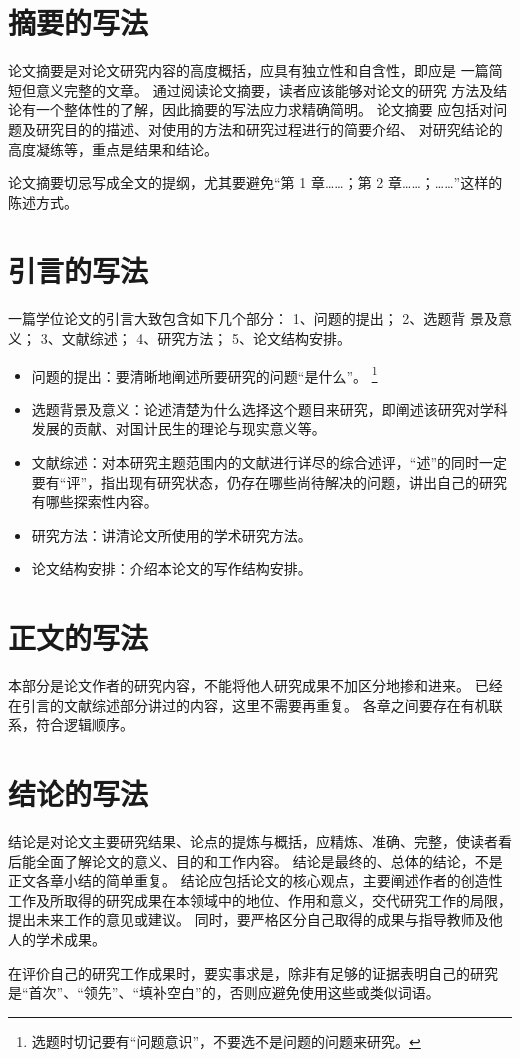 \section{摘要的写法}

论文摘要是对论文研究内容的高度概括，应具有独立性和自含性，即应是 一篇简短但意义完整的文章。
通过阅读论文摘要，读者应该能够对论文的研究 方法及结论有一个整体性的了解，因此摘要的写法应力求精确简明。
论文摘要 应包括对问题及研究目的的描述、对使用的方法和研究过程进行的简要介绍、 对研究结论的高度凝练等，重点是结果和结论。

论文摘要切忌写成全文的提纲，尤其要避免“第 1 章……；第 2 章……；……”这样的陈述方式。



\section{引言的写法}

一篇学位论文的引言大致包含如下几个部分：
1、问题的提出；
2、选题背 景及意义；
3、文献综述；
4、研究方法；
5、论文结构安排。
\begin{itemize}
  \item 问题的提出：要清晰地阐述所要研究的问题“是什么”。
    \footnote{选题时切记要有“问题意识”，不要选不是问题的问题来研究。}
  \item 选题背景及意义：论述清楚为什么选择这个题目来研究，即阐述该研究对学科发展的贡献、对国计民生的理论与现实意义等。
  \item 文献综述：对本研究主题范围内的文献进行详尽的综合述评，“述”的同时一定要有“评”，指出现有研究状态，仍存在哪些尚待解决的问题，讲出自己的研究有哪些探索性内容。
  \item 研究方法：讲清论文所使用的学术研究方法。
  \item 论文结构安排：介绍本论文的写作结构安排。
\end{itemize}



\section{正文的写法}

本部分是论文作者的研究内容，不能将他人研究成果不加区分地掺和进来。
已经在引言的文献综述部分讲过的内容，这里不需要再重复。
各章之间要存在有机联系，符合逻辑顺序。



\section{结论的写法}

结论是对论文主要研究结果、论点的提炼与概括，应精炼、准确、完整，使读者看后能全面了解论文的意义、目的和工作内容。
结论是最终的、总体的结论，不是正文各章小结的简单重复。
结论应包括论文的核心观点，主要阐述作者的创造性工作及所取得的研究成果在本领域中的地位、作用和意义，交代研究工作的局限，提出未来工作的意见或建议。
同时，要严格区分自己取得的成果与指导教师及他人的学术成果。

在评价自己的研究工作成果时，要实事求是，除非有足够的证据表明自己的研究是“首次”、“领先”、“填补空白”的，否则应避免使用这些或类似词语。
